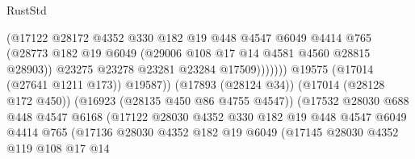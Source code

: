 \begin{lexlean}{RustStd}
\begin{coremodule}
                                            (@17122
                                              @28172
                                              @4352
                                              @330
                                              @182
                                              @19
                                              @448
                                              @4547
                                              @6049
                                              @4414
                                              @765
                                              (@28773
                                                @182
                                                @19
                                                @6049
                                                (@29006 @108 @17 @14 @4581 @4560 @28815 @28903))
                                              @23275
                                              @23278
                                              @23281
                                              @23284
                                              @17509)))))))
                                @19575
                                (@17014 (@27641 @1211 @173))
                                @19587))
                            (@17893 (@28124 @34))
                            (@17014 (@28128 @172 @450))
                            (@16923 (@28135 @450 @86 @4755 @4547))
                            (@17532
                              @28030
                              @688
                              @448
                              @4547
                              @6168
                              (@17122
                                @28030
                                @4352
                                @330
                                @182
                                @19
                                @448
                                @4547
                                @6049
                                @4414
                                @765
                                (@17136
                                  @28030
                                  @4352
                                  @182
                                  @19
                                  @6049
                                  (@17145
                                    @28030
                                    @4352
                                    @119
                                    @108
                                    @17
                                    @14

\end{coremodule}
\end{lexlean}
